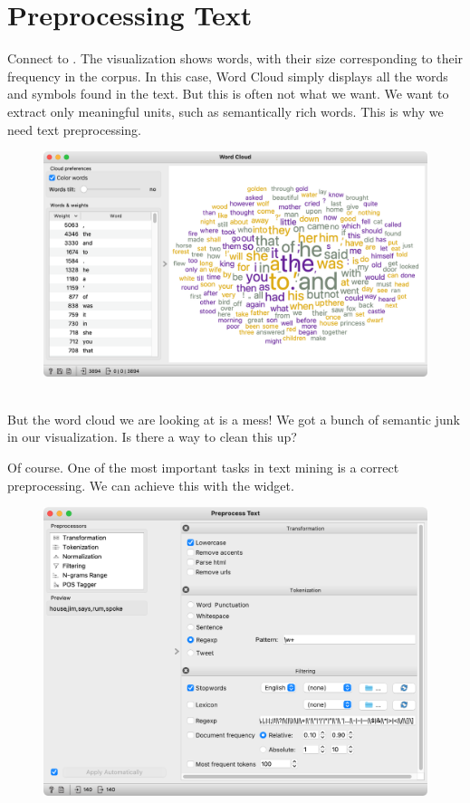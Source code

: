 \chapter{Preprocessing Text}

Connect  to . The visualization shows words, with their size corresponding to their frequency in the corpus. In this case, Word Cloud simply displays all the words and symbols found in the text. But this is often not what we want. We want to extract only meaningful units, such as semantically rich words. This is why we need text preprocessing.

\vspace{-0.2cm}
\begin{figure}[h]
  \centering
  \includegraphics[width=\linewidth]{word-cloud.png}%
  \caption{$\;$}
\end{figure}
\vspace{-0.3cm}

But the word cloud we are looking at is a mess! We got a bunch of semantic junk in our visualization. Is there a way to clean this up?

Of course. One of the most important tasks in text mining is a correct preprocessing. We can achieve this with the  widget.

\vspace{-0.2cm}
\begin{figure}[h]
  \centering
  \includegraphics[width=\linewidth]{preprocess-text.png}%
  \caption{$\;$}
\end{figure}
\vspace{-0.3cm}

